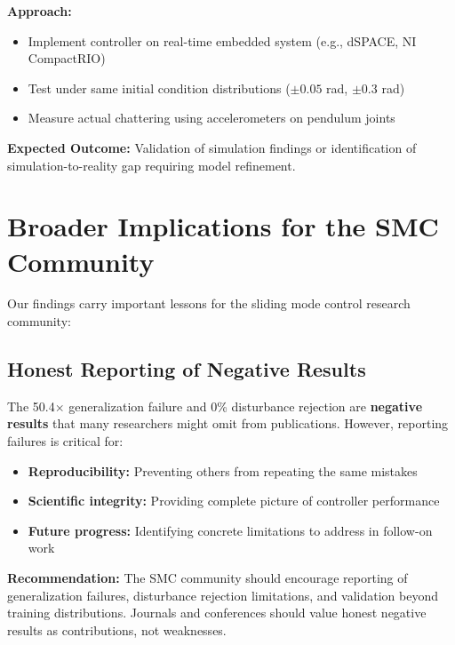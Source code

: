 \textbf{Approach:}
\begin{itemize}
    \item Implement controller on real-time embedded system (e.g., dSPACE, NI CompactRIO)
    \item Test under same initial condition distributions ($\pm 0.05$ rad, $\pm 0.3$ rad)
    \item Measure actual chattering using accelerometers on pendulum joints
\end{itemize}

\textbf{Expected Outcome:} Validation of simulation findings or identification of simulation-to-reality gap requiring model refinement.

\section{Broader Implications for the SMC Community}
\label{sec:broader_implications}

Our findings carry important lessons for the sliding mode control research community:

\subsection{Honest Reporting of Negative Results}
\label{subsec:negative_results}

The 50.4$\times$ generalization failure and 0\% disturbance rejection are \textbf{negative results} that many researchers might omit from publications. However, reporting failures is critical for:
\begin{itemize}
    \item \textbf{Reproducibility:} Preventing others from repeating the same mistakes
    \item \textbf{Scientific integrity:} Providing complete picture of controller performance
    \item \textbf{Future progress:} Identifying concrete limitations to address in follow-on work
\end{itemize}

\textbf{Recommendation:} The SMC community should encourage reporting of generalization failures, disturbance rejection limitations, and validation beyond training distributions. Journals and conferences should value honest negative results as contributions, not weaknesses.

